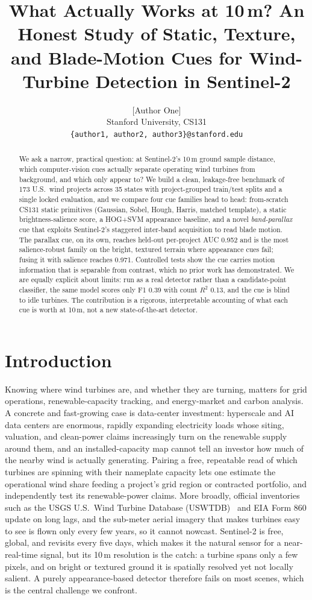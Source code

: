 \documentclass[10pt,twocolumn,letterpaper]{article}
\title{What Actually Works at 10\,m? An Honest Study of Static, Texture, and Blade-Motion Cues for Wind-Turbine Detection in Sentinel-2}
\author{%
[Author One] \quad [Author Two] \quad [Author Three]\\
Stanford University, CS131\\
{\tt\small \{author1, author2, author3\}@stanford.edu}
}
\begin{document}
\maketitle

\begin{abstract}
We ask a narrow, practical question: at Sentinel-2's 10\,m ground sample distance, which computer-vision cues actually separate operating wind turbines from background, and which only appear to? We build a clean, leakage-free benchmark of 173 U.S.\ wind projects across 35 states with project-grouped train/test splits and a single locked evaluation, and we compare four cue families head to head: from-scratch CS131 static primitives (Gaussian, Sobel, Hough, Harris, matched template), a static brightness-salience score, a HOG+SVM appearance baseline, and a novel \emph{band-parallax} cue that exploits Sentinel-2's staggered inter-band acquisition to read blade motion. The parallax cue, on its own, reaches held-out per-project AUC 0.952 and is the most salience-robust family on the bright, textured terrain where appearance cues fail; fusing it with salience reaches 0.971. Controlled tests show the cue carries motion information that is separable from contrast, which no prior work has demonstrated. We are equally explicit about limits: run as a real detector rather than a candidate-point classifier, the same model scores only F1 0.39 with count $R^2$ 0.13, and the cue is blind to idle turbines. The contribution is a rigorous, interpretable accounting of what each cue is worth at 10\,m, not a new state-of-the-art detector.
\end{abstract}

\section{Introduction}
Knowing where wind turbines are, and whether they are turning, matters for grid operations, renewable-capacity tracking, and energy-market and carbon analysis. A concrete and fast-growing case is data-center investment: hyperscale and AI data centers are enormous, rapidly expanding electricity loads whose siting, valuation, and clean-power claims increasingly turn on the renewable supply around them, and an installed-capacity map cannot tell an investor how much of the nearby wind is actually generating. Pairing a free, repeatable read of which turbines are spinning with their nameplate capacity lets one estimate the operational wind share feeding a project's grid region or contracted portfolio, and independently test its renewable-power claims. More broadly, official inventories such as the USGS U.S.\ Wind Turbine Database (USWTDB)~\cite{uswtdb} and EIA Form 860 update on long lags, and the sub-meter aerial imagery that makes turbines easy to see is flown only every few years, so it cannot nowcast. Sentinel-2 is free, global, and revisits every five days, which makes it the natural sensor for a near-real-time signal, but its 10\,m resolution is the catch: a turbine spans only a few pixels, and on bright or textured ground it is spatially resolved yet not locally salient. A purely appearance-based detector therefore fails on most scenes, which is the central challenge we confront.
\end{document}
